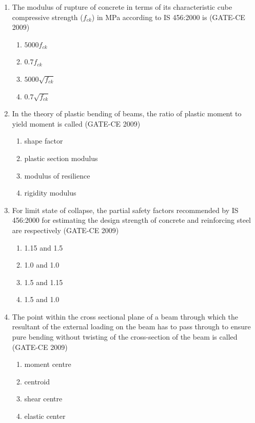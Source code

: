 \documentclass[journal,12pt,onecolumn]{article}
\theoremstyle{remark}
\begin{document}
\begin{enumerate}
    \item The modulus of rupture of concrete in terms of its characteristic cube compressive strength ($f_{ck}$) in MPa according to IS 456:2000 is (GATE-CE 2009)
    \begin{enumerate}
        \item $5000f_{ck}$ 
        \item $0.7f_{ck}$ 
        \item $5000\sqrt{f_{ck}}$ 
        \item $0.7\sqrt{f_{ck}}$
    \end{enumerate}
    
    \item In the theory of plastic bending of beams, the ratio of plastic moment to yield moment is called (GATE-CE 2009)
    \begin{enumerate}
        \item shape factor 
        \item plastic section modulus 
        \item modulus of resilience 
        \item rigidity modulus
    \end{enumerate}
    
    \item For limit state of collapse, the partial safety factors recommended by IS 456:2000 for estimating the design strength of concrete and reinforcing steel are respectively (GATE-CE 2009)
    \begin{enumerate}
        \item 1.15 and 1.5 
        \item 1.0 and 1.0 
        \item 1.5 and 1.15 
        \item 1.5 and 1.0
    \end{enumerate}
    
    \item The point within the cross sectional plane of a beam through which the resultant of the external loading on the beam has to pass through to ensure pure bending without twisting of the cross-section of the beam is called (GATE-CE 2009)
    \begin{enumerate}
        \item moment centre 
        \item centroid 
        \item shear centre 
        \item elastic center
    \end{enumerate}
    

\end{enumerate}
\end{document}
